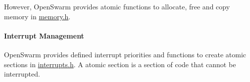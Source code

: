 However, Open\+Swarm provides atomic functions to allocate, free and copy memory in \hyperlink{memory_8h}{memory.\+h}.\hypertarget{group__base_ssec_intro_base_irq}{}\paragraph{Interrupt Management}\label{group__base_ssec_intro_base_irq}
Open\+Swarm provides defined interrupt priorities and functions to create atomic sections in \hyperlink{interrupts_8h}{interrupts.\+h}. A atomic section is a section of code that cannot be interrupted. 